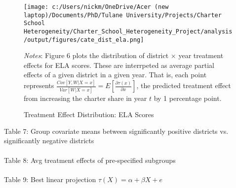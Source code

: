 \documentclass{article} %
\begin{document}
\begin{figure}[H]
\centering
\texttt{[image: c:/Users/nickm/OneDrive/Acer (new laptop)/Documents/PhD/Tulane University/Projects/Charter School Heterogeneity/Charter\_School\_Heterogeneity\_Project/analysis/output/figures/cate\_dist\_ela.png]}
\caption{Treatment Effect Distribution: ELA Scores}
\label{fig:image6}
\begin{minipage}{1\linewidth}
\singlespacing
\footnotesize
\emph{Notes}: Figure 6 plots the distribution of district $\times$ year treatment effects for ELA scores. These are interrpeted as average partial effects of a given district in a given year. That is, each point represents $\frac{Cov[Y, W | X = x]}{Var[W | X = x]} = E\left[ \frac{\partial \tau(x)}{\partial x} \right]$, the predicted treatment effect from increasing the charter share in year $t$ by 1 percentage point.
\end{minipage}
\end{figure}



Table 7: Group covariate means between significantly positive districts vs. significantly negative districts\\
\\


Table 8: Avg treatment effects of pre-specified subgroups\\
\\

Table 9: Best linear projection $\tau(X) = \alpha + \beta X + e$\\
\\



	
	

	
	

	
	
	 
	

	
	
	


	




	 

 
\end{document}
